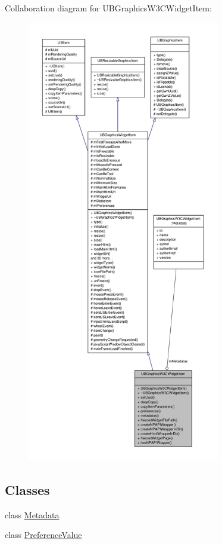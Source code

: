 Collaboration diagram for U\-B\-Graphics\-W3\-C\-Widget\-Item\-:
\nopagebreak
\begin{figure}[H]
\begin{center}
\leavevmode
\includegraphics[height=550pt]{db/df8/class_u_b_graphics_w3_c_widget_item__coll__graph}
\end{center}
\end{figure}
\subsection*{Classes}
\begin{DoxyCompactItemize}
\item 
class \hyperlink{class_u_b_graphics_w3_c_widget_item_1_1_metadata}{Metadata}
\item 
class \hyperlink{class_u_b_graphics_w3_c_widget_item_1_1_preference_value}{Preference\-Value}
\end{DoxyCompactItemize}
